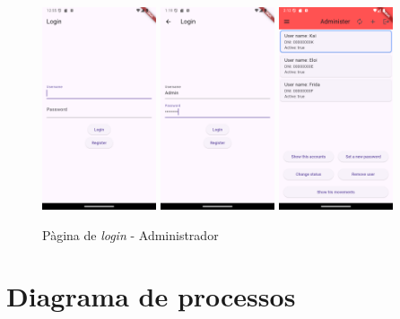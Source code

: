 \documentclass[a4paper,12pt,twoside]{ThesisStyle}
\begin{document}
\begin{figure}[h]
    \centering
    \includegraphics[width=0.3\textwidth]{imatges/login.png}
    \includegraphics[width=0.3\textwidth]{imatges/loginAdmin.png}
    \includegraphics[width=0.3\textwidth]{imatges/administer.png}
    \caption{Pàgina de \textit{login} - Administrador}
    \label{fig: Pàgina de login - Admin}
\end{figure}

\clearpage

\section{Diagrama de processos}
\label{ sec: Diagrama de processos }
\end{document}
